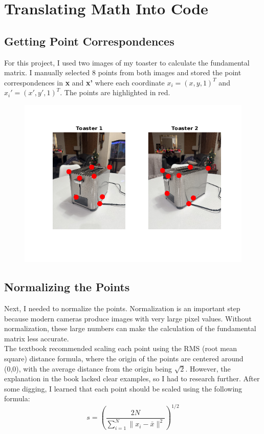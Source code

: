 \documentclass{article}
\begin{document}
\section{Translating Math Into Code}
\subsection{Getting Point Correspondences}
For this project, I used two images of my toaster to calculate the fundamental matrix. I manually selected 8 points from both images and stored the point correspondences in \textbf{x} and \textbf{x'} where each coordinate $x_i = (x,y,1)^T$ and $x_i' = (x',y',1)^T$. The points are highlighted in red.
\begin{figure}[H]
    \centering
    \includegraphics[width=1\textwidth]{point_correspondences.png}
\end{figure}

\subsection{Normalizing the Points}
Next, I needed to normalize the points. Normalization is an important step because modern cameras produce images with very large pixel values. Without normalization, these large numbers can make the calculation of the fundamental matrix less accurate. \\

The textbook recommended scaling each point using the RMS (root mean square) distance formula, where the origin of the points are centered around (0,0), with the average distance from the origin being $\sqrt{2}$. However, the explanation in the book lacked clear examples, so I had to research further. After some digging, I learned that each point should be scaled using the following formula:
$$
s = \left( \frac{2N}{\sum_{i=1}^N \|x_i - \bar{x}\|^2} \right)^{1/2}
$$
\end{document}
